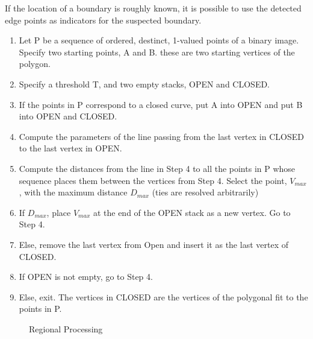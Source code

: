 If the location of a boundary is roughly known, it is possible to use the detected edge points as indicators for the suspected boundary.
\begin{enumerate}
\item Let P be a sequence of ordered, destinct, 1-valued points of a binary image. Specify two starting points, A and B. these are two starting vertices of the polygon.
\item Specify a threshold T, and two empty stacks, OPEN and CLOSED.
\item If the points in P correspond to a closed curve, put A into OPEN and put B into OPEN and CLOSED.
\item Compute the parameters of the line passing from the last vertex in CLOSED to the last vertex in OPEN.
\item Compute the distances from the line in Step 4 to all the points in P whose sequence places them between the vertices from Step 4. Select the point, $V_{max}$, with the maximum distance $D_{max}$ (ties are resolved arbitrarily)
\item If $D_{max}$, place $V_{max}$ at the end of the OPEN stack as a new vertex. Go to Step 4.
\item Else, remove the last vertex from Open and insert it as the last vertex of CLOSED.
\item If OPEN is not empty, go to Step 4.
\item Else, exit. The vertices in CLOSED are the vertices of the polygonal fit to the points in P.
\end{enumerate}
\begin{figure}[h]
	\centering
	\caption{Regional Processing}
\end{figure}
